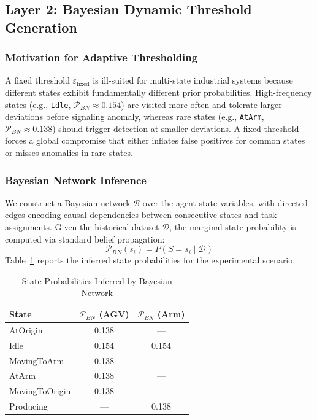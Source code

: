 \documentclass[manuscript,screen,review]{acmart}
\begin{document}
\subsection{Layer 2: Bayesian Dynamic Threshold Generation}
\label{subsec:layer2}

\subsubsection{Motivation for Adaptive Thresholding}

A fixed threshold $\varepsilon_{\text{fixed}}$ is ill-suited
for multi-state industrial systems because different states
exhibit fundamentally different prior probabilities. High-frequency
states (e.g., \texttt{Idle}, $\mathcal{P}_{BN} \approx 0.154$)
are visited more often and tolerate larger deviations before
signaling anomaly, whereas rare states (e.g., \texttt{AtArm},
$\mathcal{P}_{BN} \approx 0.138$) should trigger detection
at smaller deviations. A fixed threshold forces a global
compromise that either inflates false positives for common
states or misses anomalies in rare states.

\subsubsection{Bayesian Network Inference}

We construct a Bayesian network $\mathcal{B}$ over the agent
state variables, with directed edges encoding causal
dependencies between consecutive states and task assignments.
Given the historical dataset $\mathcal{D}$, the marginal
state probability is computed via standard belief propagation:
\begin{equation}
  \mathcal{P}_{BN}(s_i) = P(S = s_i \mid \mathcal{D})
  \label{eq:bn_inference}
\end{equation}
Table~\ref{tab:bn_probs} reports the inferred state
probabilities for the experimental scenario.

\begin{table}[!t]
\renewcommand{\arraystretch}{1.3}
\caption{State Probabilities Inferred by Bayesian Network}
\label{tab:bn_probs}
\centering
\begin{tabular}{lcc}
\toprule
\textbf{State} & \textbf{$\mathcal{P}_{BN}$ (AGV)} &
\textbf{$\mathcal{P}_{BN}$ (Arm)} \\
\midrule
AtOrigin        & 0.138 & ---   \\
Idle            & 0.154 & 0.154 \\
MovingToArm     & 0.138 & ---   \\
AtArm           & 0.138 & ---   \\
MovingToOrigin  & 0.138 & ---   \\
Producing       & ---   & 0.138 \\
\bottomrule
\end{tabular}
\end{table}
\end{document}
